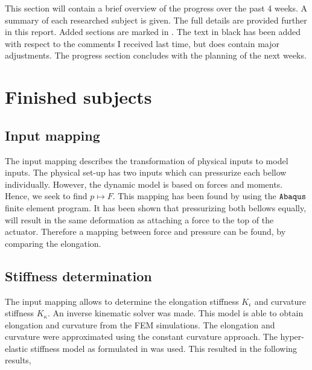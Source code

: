 This section will contain a brief overview of the progress over the past 4 weeks. A summary of each researched subject is given. The full details are provided further in this report. Added sections are marked in . The text in black has been added with respect to the comments I received last time, but does contain major adjustments. The progress section concludes with the planning of the next weeks.


\section{Finished subjects}

\subsection{Input mapping}

The input mapping describes the transformation of physical inputs to model inputs. The physical set-up has two inputs which can pressurize each bellow individually. However, the dynamic model is based on forces and moments. Hence, we seek to find $p \mapsto F$. This mapping has been found by using the $\verb+Abaqus+$ finite element program. It has been shown that pressurizing both bellows equally, will result in the same deformation as attaching a force to the top of the actuator. Therefore a mapping between force and pressure can be found, by comparing the elongation.


\subsection{Stiffness determination}

The input mapping allows to determine the elongation stiffness $K_\epsilon$ and curvature stiffness $K_\kappa$. An inverse kinematic solver was made. This model is able to obtain elongation and curvature from the FEM simulations. The elongation and curvature were approximated using the constant curvature approach. The hyper-elastic stiffness model as formulated in \cite{Caasenbrood2020StiffnessModel} was used. This resulted in the following results,


